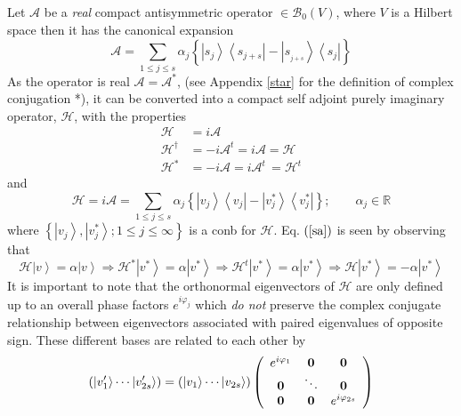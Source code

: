 \documentclass[aps,preprint]{revtex4}%
\begin{document}
Let $\mathcal{A}$ be a \emph{real} compact antisymmetric operator
$\in\mathcal{B}_{0}\left(  V\right)  $, where $V$ is a Hilbert space then it
has the canonical expansion
\begin{equation}
\mathcal{A=}\sum_{1\leq j\leq s}\alpha_{j}\left\{  \left\vert s_{j}%
\right\rangle \left\langle s_{j+s}\right\vert -\left\vert s_{_{j+s}%
}\right\rangle \left\langle s_{j}\right\vert \right\} \label{anti}%
\end{equation}
As the operator is real $\mathcal{A=A}^{\ast}$, (see Appendix \ref{star} for
the definition of complex conjugation *), it can be converted into a compact
self adjoint purely imaginary operator, $\mathcal{H}$, with the properties
\begin{align}
\mathcal{H}  & =i\mathcal{A}\nonumber\\
\mathcal{H}^{\dagger}  & =-i\mathcal{A}^{t}=i\mathcal{A=H}\nonumber\\
\mathcal{H}^{\ast}  & =-i\mathcal{A}=i\mathcal{A}^{t}\,\mathcal{=H}^{t}%
\end{align}
and
\begin{equation}
\mathcal{H}=i\mathcal{A=}\sum_{1\leq j\leq s}\alpha_{j}\left\{  \left\vert
v_{j}\right\rangle \left\langle v_{j}\right\vert -\left\vert v_{j}^{\ast
}\right\rangle \left\langle v_{j}^{\ast}\right\vert \right\}  ;\qquad
\alpha_{j}\in\mathbb{R}\label{sa}%
\end{equation}
where $\left\{  \left\vert v_{j}\right\rangle ,\left\vert v_{j}^{\ast
}\right\rangle ;1\leq j\leq\infty\right\}  $ is a conb for $\mathcal{H}$. Eq.
$\left(  \ref{sa}\right)  $ is seen by observing that
\begin{equation}
\mathcal{H}\left\vert v\right\rangle =\alpha\left\vert v\right\rangle
\Rightarrow\mathcal{H}^{\ast}\left\vert v^{\ast}\right\rangle =\alpha
\left\vert v^{\ast}\right\rangle \Rightarrow\mathcal{H}^{t}\left\vert v^{\ast
}\right\rangle =\alpha\left\vert v^{\ast}\right\rangle \Rightarrow
\mathcal{H}\left\vert v^{\ast}\right\rangle =-\alpha\left\vert v^{\ast
}\right\rangle
\end{equation}
It is important to note that the orthonormal eigenvectors of $\mathcal{H}$ are
only defined up to an overall phase factors $e^{i\varphi_{j}}$ which \emph{do
not} preserve the complex conjugate relationship between eigenvectors
associated with paired eigenvalues of opposite sign. These different bases are
related to each other by
\begin{equation}
\left(  \left\vert v_{1}^{\prime}\right\rangle \cdots\left\vert v_{2s}%
^{\prime}\right\rangle \right)  =\left(  \left\vert v_{1}\right\rangle
\cdots\left\vert v_{2s}\right\rangle \right)  \left(
\begin{array}
[c]{ccc}%
e^{i\varphi_{1}} & \mathbf{0} & \mathbf{0}\\
\mathbf{0} & \ddots & \mathbf{0}\\
\mathbf{0} & \mathbf{0} & e^{i\varphi_{2s}}%
\end{array}
\right)
\end{equation}
\end{document}
